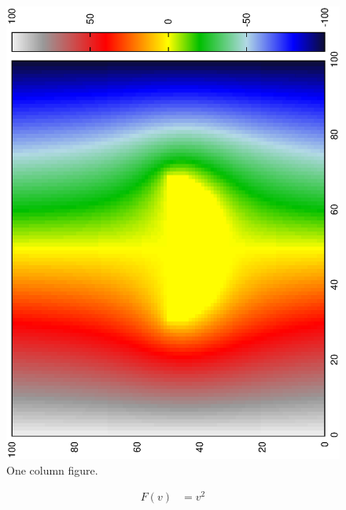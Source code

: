 \documentclass[aps,twocolumn,pre,nofootinbib]{revtex4}
\begin{document}
\begin{figure}
\includegraphics*[width=\breite \columnwidth]{circle.ps} 
\caption{One column figure.
}
\label{fig:Half}
\end{figure}
 
\begin{equation}
\begin{split}
F(v) &= v^2 
\end{split}
\label{Simple example}
\end{equation}


\end{document}
